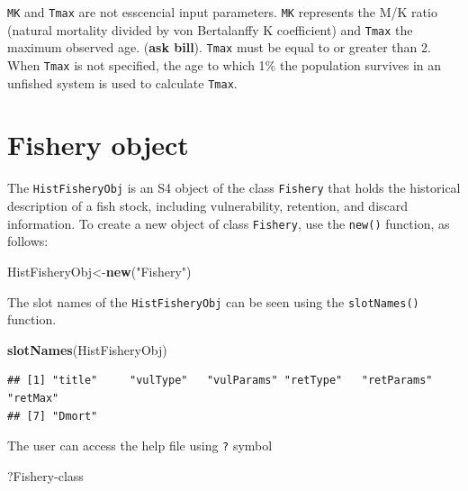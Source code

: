 \documentclass[
]{book}
\newenvironment{Shaded}{\begin{snugshade}}{\end{snugshade}}
\newcommand{\AttributeTok}[1]{\textcolor[rgb]{0.13,0.29,0.53}{#1}}
\newcommand{\FunctionTok}[1]{\textcolor[rgb]{0.13,0.29,0.53}{\textbf{#1}}}
\newcommand{\NormalTok}[1]{#1}
\newcommand{\OtherTok}[1]{\textcolor[rgb]{0.56,0.35,0.01}{#1}}
\newcommand{\StringTok}[1]{\textcolor[rgb]{0.31,0.60,0.02}{#1}}
\begin{document}
\texttt{MK} and \texttt{Tmax} are not esscencial input parameters. \texttt{MK} represents the M/K ratio (natural mortality divided by von Bertalanffy K coefficient) and \texttt{Tmax} the maximum observed age. (\textbf{ask bill}). \texttt{Tmax} must be equal to or greater than 2. When \texttt{Tmax} is not specified, the age to which 1\% the population survives in an unfished system is used to calculate \texttt{Tmax}.

\section{Fishery object}\label{fishery-object}

The \texttt{HistFisheryObj} is an S4 object of the class \texttt{Fishery} that holds the historical description of a fish stock, including vulnerability, retention, and discard information.
To create a new object of class \texttt{Fishery}, use the \texttt{new()} function, as follows:

\begin{Shaded}
\begin{Highlighting}[]
\NormalTok{HistFisheryObj}\OtherTok{\textless{}{-}}\FunctionTok{new}\NormalTok{(}\StringTok{"Fishery"}\NormalTok{)}
\end{Highlighting}
\end{Shaded}

The slot names of the \texttt{HistFisheryObj} can be seen using the \texttt{slotNames()} function.

\begin{Shaded}
\begin{Highlighting}[]
\FunctionTok{slotNames}\NormalTok{(HistFisheryObj)}
\end{Highlighting}
\end{Shaded}

\begin{verbatim}
## [1] "title"     "vulType"   "vulParams" "retType"   "retParams" "retMax"   
## [7] "Dmort"
\end{verbatim}

The user can access the help file using \texttt{?} symbol

\begin{Shaded}
\begin{Highlighting}[]
\NormalTok{?}\StringTok{\textasciigrave{}}\AttributeTok{Fishery{-}class}\StringTok{\textasciigrave{}}  
\end{Highlighting}
\end{Shaded}
\end{document}
